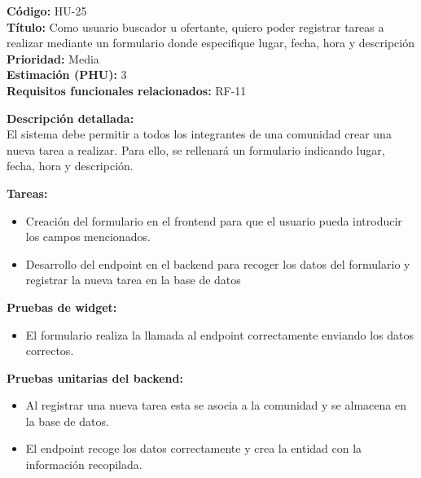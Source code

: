 \begin{tarjetaHU}
\textbf{Código:} HU-25 \\
\textbf{Título:} Como usuario buscador u ofertante, quiero poder registrar tareas a realizar mediante un formulario donde especifique lugar, fecha, hora y descripción \\
\textbf{Prioridad:} Media \\
\textbf{Estimación (PHU):} 3 \\
\textbf{Requisitos funcionales relacionados:} RF-11

\vspace{0.5em}
\textbf{Descripción detallada:} \\
El sistema debe permitir a todos los integrantes de una comunidad crear una nueva tarea a realizar. Para ello, se rellenará un formulario indicando lugar, fecha, hora y descripción.

\vspace{0.5em}
\textbf{Tareas:}
\begin{itemize}[left=0pt]
  \item Creación del formulario en el frontend para que el usuario pueda introducir los campos mencionados.
  \item Desarrollo del endpoint en el backend para recoger los datos del formulario y registrar la nueva tarea en la base de datos
\end{itemize}

\vspace{0.5em}
\textbf{Pruebas de widget:}
\begin{itemize}[left=0pt]
  \item El formulario realiza la llamada al endpoint correctamente enviando los datos correctos.
\end{itemize}
\textbf{Pruebas unitarias del backend:}
\begin{itemize}[left=0pt]
  \item Al registrar una nueva tarea esta se asocia a la comunidad y se almacena en la base de datos.
  \item El endpoint recoge los datos correctamente y crea la entidad con la información recopilada.
\end{itemize}
\end{tarjetaHU}

